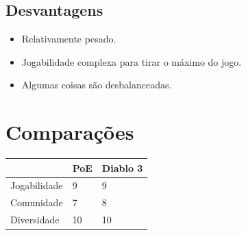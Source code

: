 \documentclass{article}
\begin{document}
\subsection{Desvantagens}
\begin{itemize}
    \item Relativamente pesado.
    \item Jogabilidade complexa para tirar o máximo do jogo.
    \item Algumas coisas são desbalanceadas.
\end{itemize}

\section{Comparações}

\begin{table}[h!]
\begin{tabular}{|l|l|l|}
\hline
             & PoE & Diablo 3 \\ \hline
Jogabilidade & 9   & 9        \\ \hline
Comunidade   & 7   & 8        \\ \hline
Diversidade  & 10  & 10       \\ \hline
\end{tabular}
\end{table}



\end{document}
